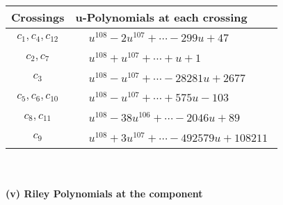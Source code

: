 \documentclass[1p]{elsarticle_modified}
\theoremstyle{definition}
\begin{document}
\begin{tabular}{m{50pt}|m{274pt}}
Crossings & \hspace{64pt}u-Polynomials at each crossing \\
\hline $$\begin{aligned}c_{1},c_{4},c_{12}\end{aligned}$$&$\begin{aligned}
&u^{108}-2 u^{107}+\cdots-299 u+47
\end{aligned}$\\
\hline $$\begin{aligned}c_{2},c_{7}\end{aligned}$$&$\begin{aligned}
&u^{108}+u^{107}+\cdots+u+1
\end{aligned}$\\
\hline $$\begin{aligned}c_{3}\end{aligned}$$&$\begin{aligned}
&u^{108}- u^{107}+\cdots-28281 u+2677
\end{aligned}$\\
\hline $$\begin{aligned}c_{5},c_{6},c_{10}\end{aligned}$$&$\begin{aligned}
&u^{108}- u^{107}+\cdots+575 u-103
\end{aligned}$\\
\hline $$\begin{aligned}c_{8},c_{11}\end{aligned}$$&$\begin{aligned}
&u^{108}-38 u^{106}+\cdots-2046 u+89
\end{aligned}$\\
\hline $$\begin{aligned}c_{9}\end{aligned}$$&$\begin{aligned}
&u^{108}+3 u^{107}+\cdots-492579 u+108211
\end{aligned}$\\
\hline
\end{tabular}\\~\\
\newpage\renewcommand{\arraystretch}{1}
\flushleft \textbf{(v) Riley Polynomials at the component}\newline \\
\end{document}

